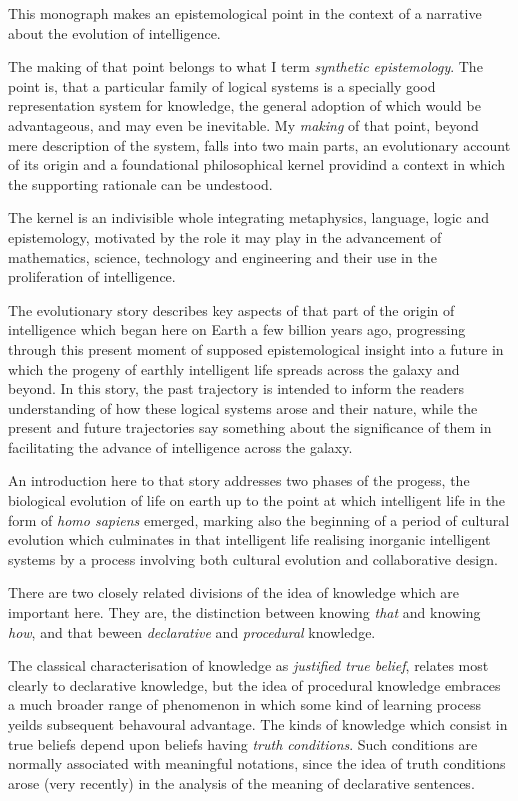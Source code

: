 
This monograph makes an epistemological point in the context of a narrative about the evolution of intelligence.

The making of that point belongs to what I term \emph{synthetic epistemology}.
The point is, that a particular family of logical systems is a specially good representation system for knowledge, the general adoption of which would be advantageous, and may even be inevitable.
My \emph{making} of that point, beyond mere description of the system, falls into two main parts, an evolutionary account of its origin and a foundational philosophical kernel providind a context in which the supporting rationale can be undestood.

The kernel is an indivisible whole integrating metaphysics, language, logic and epistemology, motivated by the role it may play in the advancement of mathematics, science, technology and engineering and their use in the proliferation of intelligence. 

The evolutionary story describes key aspects of that part of the origin of intelligence which began here on Earth a few billion years ago, progressing through this present moment of supposed epistemological insight into a future in which the progeny of earthly intelligent life spreads across the galaxy and beyond.
In this story, the past trajectory is intended to inform the readers understanding of how these logical systems arose and their nature, while the present and future trajectories say something about the significance of them in facilitating the advance of intelligence across the galaxy.

An introduction here to that story addresses two phases of the progess, the biological evolution of life on earth up to the point at which intelligent life in the form of \emph{homo sapiens} emerged, marking also the beginning of a period of cultural evolution which culminates in that intelligent life realising inorganic intelligent systems by a process involving both cultural evolution and collaborative design.

There are two closely related divisions of the idea of knowledge which are important here.
They are, the distinction between knowing \emph{that} and knowing \emph{how}, and that beween \emph{declarative} and \emph{procedural} knowledge.

The classical characterisation of knowledge as \emph{justified true belief}, relates most clearly to declarative knowledge, but the idea of procedural knowledge embraces a much broader range of phenomenon in which some kind of learning process yeilds subsequent behavoural advantage.
The kinds of knowledge which consist in true beliefs depend upon beliefs having \emph{truth conditions}.
Such conditions are normally associated with meaningful notations, since the idea of truth conditions arose (very recently) in the analysis of the meaning of declarative sentences.

